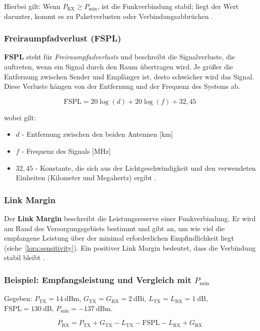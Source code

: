 	Hierbei gilt: Wenn \(P_\text{RX} \geq P_\text{min}\), ist die Funkverbindung stabil; liegt der Wert darunter, kommt es zu Paketverlusten oder Verbindungsabbrüchen \cite{PaIn:2021}.
	
	\subsubsection{Freiraumpfadverlust (FSPL) \label{lora:fspl}}
	\textbf{FSPL} steht für \emph{Freiraumpfadverlusts} und beschreibt die Signalverluste, die auftreten, wenn ein Signal durch den Raum übertragen wird. Je grö{\ss}er die Entfernung zwischen Sender und Empfänger ist, desto schwächer wird das Signal. Diese Verluste hängen von der Entfernung und der Frequenz des Systems ab.
	
	\[
	\text{FSPL} = 20 \log(d) + 20 \log(f) + 32{,}45
	\]
	
	wobei gilt:
	\begin{itemize}
		\item \(d\) - Entfernung zwischen den beiden Antennen [km]
		\item \(f\) - Frequenz des Signals [MHz]
		\item \(32{,}45\) -  Konstante, die sich aus der Lichtgeschwindigkeit und den verwendeten 
		Einheiten (Kilometer und Megahertz) ergibt \cite{Collins:2021}.
	\end{itemize}
	
	
	\subsubsection{Link Margin}
	Der \textbf{Link Margin} beschreibt die Leistungsreserve einer Funkverbindung. Er wird am Rand des Versorgungsgebiets bestimmt und gibt an, um wie viel die empfangene Leistung über der minimal erforderlichen Empfindlichkeit liegt (siehe~\ref{lora:sensitivity}). Ein positiver Link Margin bedeutet, dass die Verbindung stabil bleibt \cite{PaIn:2021}.
	
	
	\subsubsection{Beispiel: Empfangsleistung und Vergleich mit \(P_\text{min}\)}
	Gegeben: \(P_\text{TX} = 14~\text{dBm}\), \(G_\text{TX} = G_\text{RX} = 2~\text{dBi}\), 
	\(L_\text{TX} = L_\text{RX} = 1~\text{dB}\), \(\text{FSPL} = 130~\text{dB}\), \(P_\text{min} = -137~\text{dBm}\).
	
	\[
	P_\text{RX} = P_\text{TX} + G_\text{TX} - L_\text{TX} - \text{FSPL} - L_\text{RX} + G_\text{RX}
	\]
	
